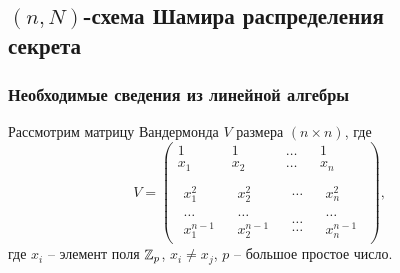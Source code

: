 \subsection[$(n,N)$-схема Шамира]{$(n,N)$-схема Шамира распределения \protect\\ секрета}


\subsubsection{Необходимые сведения из линейной алгебры}

Рассмотрим матрицу Вандермонда $V$ размера $(n \times n)$, где
\[
    V = \left(\begin{array}{cccc}
        {1} & {1} & { \ldots } & {1} \\
        {x_{1} } & {x_{2} } & { \ldots } & {x_{n} } \\
        {\begin{array}{l} {} \\ {x_{1}^{2} } \end{array}} &
            {\begin{array}{l} {} \\ {x_{2}^{2} } \end{array}} &
            {\begin{array}{l} {} \\ { \ldots } \end{array}} &
            {\begin{array}{l} {} \\ {x_{n}^{2} } \end{array}} \\
        {\begin{array}{l} { \ldots } \\ {x_{1}^{n-1} } \end{array}} &
            {\begin{array}{l} { \ldots } \\ {x_{2}^{n-1} } \end{array}} &
            {\begin{array}{l} { \ldots } \\ { \ldots } \end{array}} &
            {\begin{array}{l} { \ldots } \\ {x_{n}^{n-1} } \end{array}}
    \end{array}\right),
\]
где $x_{i}$ -- элемент поля $\mathbb{Z}_{p}$, $x_{i} \ne x_{j}$, $p$ -- большое простое число.

